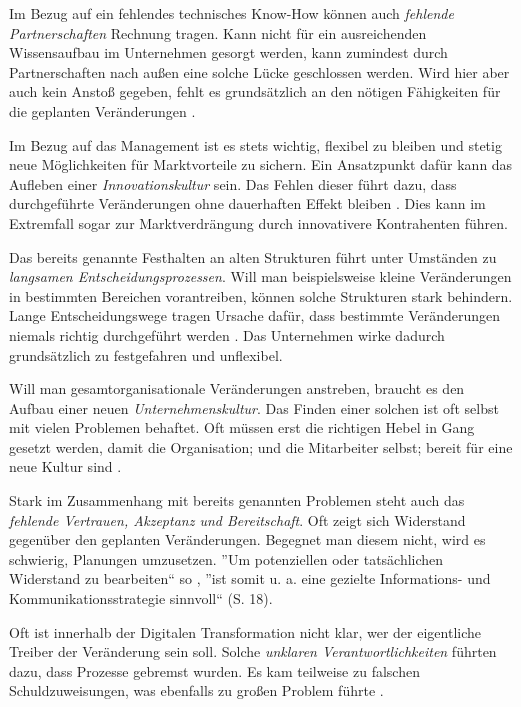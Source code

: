 Im Bezug auf ein fehlendes technisches Know-How können auch \textit{fehlende Partnerschaften} Rechnung tragen. Kann nicht für ein ausreichenden Wissensaufbau im Unternehmen gesorgt werden, kann zumindest durch Partnerschaften nach außen eine solche Lücke geschlossen werden. Wird hier aber auch kein Anstoß gegeben, fehlt es grundsätzlich an den nötigen Fähigkeiten für die geplanten Veränderungen \cite[S. 9]{nowik_promoting_2018}.

Im Bezug auf das Management ist es stets wichtig, flexibel zu bleiben und stetig neue Möglichkeiten für Marktvorteile zu sichern. Ein Ansatzpunkt dafür kann das Aufleben einer \textit{Innovationskultur} sein. Das Fehlen dieser führt dazu, dass durchgeführte Veränderungen ohne dauerhaften Effekt bleiben \cite[S. 25]{weber_digital_2015}. Dies kann im Extremfall sogar zur Marktverdrängung durch innovativere Kontrahenten führen.

Das bereits genannte Festhalten an alten Strukturen führt unter Umständen zu \textit{langsamen Entscheidungsprozessen}. Will man beispielsweise kleine Veränderungen in bestimmten Bereichen vorantreiben, können solche Strukturen stark behindern. Lange Entscheidungswege tragen Ursache dafür, dass bestimmte Veränderungen niemals richtig durchgeführt werden \cite[S. 12]{depiereux_studie_2018}. Das Unternehmen wirke dadurch grundsätzlich zu festgefahren und unflexibel.

Will man gesamtorganisationale Veränderungen anstreben, braucht es den Aufbau einer neuen \textit{Unternehmenskultur}. Das Finden einer solchen ist oft selbst mit vielen Problemen behaftet. Oft müssen erst die richtigen Hebel in Gang gesetzt werden, damit die Organisation; und die Mitarbeiter selbst; bereit für eine neue Kultur sind \cite[S. 30]{kremins_2018_2018}.

Stark im Zusammenhang mit bereits genannten Problemen steht auch das \textit{fehlende Vertrauen, Akzeptanz und Bereitschaft}. Oft zeigt sich Widerstand gegenüber den geplanten Veränderungen. Begegnet man diesem nicht, wird es schwierig, Planungen umzusetzen.  ''Um potenziellen oder tatsächlichen Widerstand zu bearbeiten`` so ,  ''ist somit u. a. eine gezielte Informations- und Kommunikationsstrategie sinnvoll`` (S. 18).

Oft ist innerhalb der Digitalen Transformation nicht klar, wer der eigentliche  Treiber der Veränderung sein soll. Solche \textit{unklaren Verantwortlichkeiten} führten dazu, dass Prozesse gebremst wurden. Es kam teilweise zu falschen Schuldzuweisungen, was ebenfalls zu großen Problem führte \cite[S. 24]{buhse_transformationswerk_2016}.

